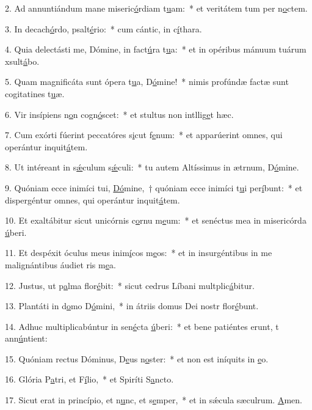 2. Ad annuntiándum mane miseric\uline{ó}rdiam t\uline{u}am:~* et veritátem tum per n\uline{o}ctem.\par 
3. In decach\uline{ó}rdo, psalt\uline{é}rio:~* cum cántic, in c\uline{í}thara.\par 
4. Quia delectásti me, Dómine, in fact\uline{ú}ra t\uline{u}a:~* et in opéribus mánuum tuárum xsult\uline{á}bo.\par 
5. Quam magnificáta sunt ópera t\uline{u}a, D\uline{ó}mine!~* nimis profúndæ factæ sunt cogitatines t\uline{u}æ.\par 
6. Vir insípiens n\uline{o}n cogn\uline{ó}scet:~* et stultus non intllig\uline{e}t hæc.\par 
7. Cum exórti fúerint peccatóres s\uline{i}cut f\uline{e}num:~* et apparúerint omnes, qui operántur inquit\uline{á}tem.\par 
8. Ut intéreant in s\uline{ǽ}culum s\uline{ǽ}culi:~* tu autem Altíssimus in ætrnum, D\uline{ó}mine.\par 
9. Quóniam ecce inimíci tui, \uline{Dó}mine,~† quóniam ecce inimíci t\uline{u}i per\uline{í}bunt:~* et dispergéntur omnes, qui operántur inquit\uline{á}tem.\par 
10. Et exaltábitur sicut unicórnis c\uline{o}rnu m\uline{e}um:~* et senéctus mea in misericórda \uline{ú}beri.\par 
11. Et despéxit óculus meus inim\uline{í}cos m\uline{e}os:~* et in insurgéntibus in me malignántibus áudiet ris m\uline{e}a.\par 
12. Justus, ut p\uline{a}lma flor\uline{é}bit:~* sicut cedrus Líbani multplic\uline{á}bitur.\par 
13. Plantáti in d\uline{o}mo D\uline{ó}mini,~* in átriis domus Dei nostr flor\uline{é}bunt.\par 
14. Adhuc multiplicabúntur in sen\uline{é}cta \uline{ú}beri:~* et bene patiéntes erunt, t ann\uline{ú}ntient:\par 
15. Quóniam rectus Dóminus, D\uline{e}us n\uline{o}ster:~* et non est iníquits in \uline{e}o.\par 
16. Glória P\uline{a}tri, et F\uline{í}lio,~* et Spiríti S\uline{a}ncto.\par 
17. Sicut erat in princípio, et n\uline{u}nc, et s\uline{e}mper,~* et in sǽcula sæculrum. \uline{A}men.\par 
